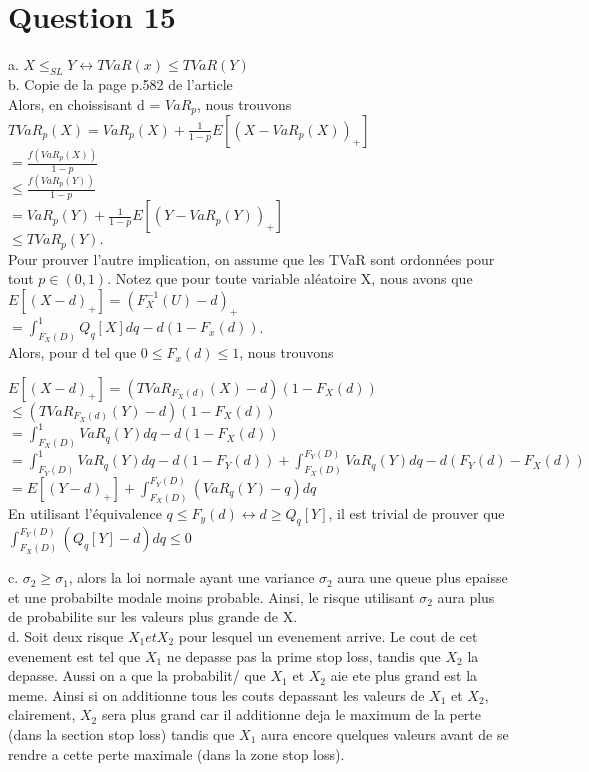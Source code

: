 \section{Question 15}
a. $X \leq_{SL} Y \leftrightarrow TVaR(x) \leq TVaR(Y)$\\

b. Copie de la page p.582 de l'article\\

Alors, en choissisant d = $VaR_p$, nous trouvons\\

$TVaR_p(X) = VaR_p(X) + \frac{1}{1-p}E[(X-VaR_p(X))_+]$ \\
$= \frac{f(VaR_p(X))}{1-p}$ \\
$\leq \frac{f(VaR_p(Y))}{1-p}$ \\
$= VaR_p(Y) + \frac{1}{1-p}E[(Y-VaR_p(Y))_+]$ \\
$\leq TVaR_p(Y).$\\


Pour prouver l'autre implication, on assume que les TVaR sont ordonnées pour tout $p \in (0,1)$. Notez que pour toute variable aléatoire X, nous avons que\\

$E[(X-d)_+] = (F^{-1}_X(U) - d)_+ $\\
$ = \int_{F_X(D)}^{1} Q_q[X]dq-d(1-F_x(d))$.\\


Alors, pour d tel que $ 0 \le F_x(d) \le 1$, nous trouvons

$E[(X-d)_+] = (TVaR_{F_X(d)}(X) - d)(1-F_X(d)) $\\
$\leq (TVaR_{F_X(d)}(Y) - d)(1-F_X(d)) $\\
$= \int_{F_X(D)}^{1} VaR_q(Y) dq - d(1-F_X(d))$\\
$ = \int_{F_Y(D)}^{1} VaR_q(Y) dq - d(1-F_Y(d)) +
\int_{F_X(D)}^{F_Y(D)} VaR_q(Y) dq - d(F_Y(d) - F_X(d))$ \\
$= E[(Y-d)_+] + \int_{F_X(D)}^{F_Y(D)} (VaR_q(Y)-q) dq$\\


En utilisant l'équivalence $q \le F_y(d) \leftrightarrow d \geq Q_q[Y]$, il est trivial de prouver que \\

$\int_{F_X(D)}^{F_Y(D)} (Q_q[Y] - d) dq \le 0$

c. $\sigma_2 \geq \sigma_1$, alors la loi normale ayant une variance $\sigma_2$ aura une queue plus epaisse et une probabilte modale moins probable. Ainsi, le risque utilisant $\sigma_2$ aura plus de probabilite sur les valeurs plus grande de X.\\

d. Soit deux risque $X_1 et X_2$ pour lesquel un evenement arrive. Le cout de cet evenement est tel que $X_1$ ne depasse pas la prime stop loss, tandis  que $X_2$ la depasse. Aussi on a que la probabilit/ que $X_1$ et $X_2$ aie ete plus grand est la meme. Ainsi si on additionne tous les couts depassant les valeurs de $X_1$ et $X_2$, clairement, $X_2$ sera plus grand car il additionne deja le maximum de la perte (dans la section stop loss) tandis que $X_1$ aura encore quelques valeurs avant de se rendre a cette perte maximale (dans la zone stop loss).\\